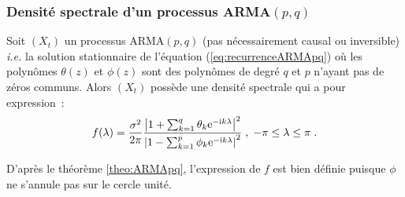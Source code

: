 \subsubsection{Densit\'e spectrale d'un processus ARMA$(p,q)$}
\begin{theorem}
Soit $(X_t)$ un processus ARMA$(p,q)$ (pas n\'ecessairement causal ou
inversible) \textit{i.e.} la solution stationnaire de l'\'equation
(\ref{eq:recurrenceARMApq}) o\`u les polyn\^omes $\theta(z)$ et $\phi(z)$ sont des
polyn\^omes de degr\'e $q$ et $p$ n'ayant pas de z\'eros communs. Alors
$(X_t)$ poss\`ede une densit\'e spectrale qui a pour expression~:
\begin{equation}
 \label{eq:dspARMApq}
 f(\lambda)=\frac{\sigma^2}{2\pi}
    \frac{\left| 1+\sum_{k=1}^q \theta_k \mathrm{e}^{-\mathrm{i} k \lambda}\right|^2}
         {\left| 1-\sum_{k=1}^p \phi_k \mathrm{e}^{-\mathrm{i} k \lambda}\right|^2}\;,\; -\pi\leq\lambda\leq\pi\;.
\end{equation}
\end{theorem}

\begin{remark}
D'apr\`es le th\'eor\`eme \ref{theo:ARMApq}, l'expression de $f$ est bien
d\'efinie puisque $\phi$ ne s'annule pas sur le cercle unit\'e.
\end{remark}





